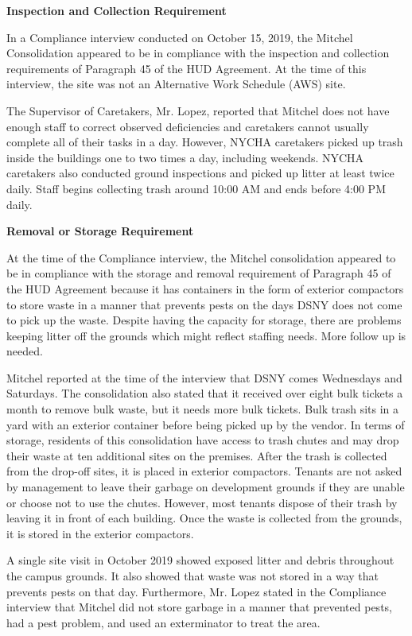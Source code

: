

\textbf{Inspection and Collection Requirement}

In a Compliance interview conducted on October 15, 2019, the Mitchel Consolidation appeared to be in compliance with the inspection and collection requirements of Paragraph 45 of the HUD Agreement. At the time of this interview, the site was not an Alternative Work Schedule (AWS) site. 

The Supervisor of Caretakers, Mr. Lopez, reported that Mitchel does not have enough staff to correct observed deficiencies and caretakers cannot usually complete all of their tasks in a day. However, NYCHA caretakers picked up trash inside the buildings one to two times a day, including weekends. NYCHA caretakers also conducted ground inspections and picked up litter at least twice daily. Staff begins collecting trash around 10:00 AM and ends before 4:00 PM daily. 

\textbf{Removal or Storage Requirement}

At the time of the Compliance interview, the Mitchel consolidation appeared to be in compliance with the storage and removal requirement of Paragraph 45 of the HUD Agreement because it has containers in the form of exterior compactors to store waste in a manner that prevents pests on the days DSNY does not come to pick up the waste. Despite having the capacity for storage, there are problems keeping litter off the grounds which might reflect staffing needs. More follow up is needed. 

Mitchel reported at the time of the interview that DSNY comes Wednesdays and Saturdays. The consolidation also stated that it received over eight bulk tickets a month to remove bulk waste, but it needs more bulk tickets. Bulk trash sits in a yard with an exterior container before being picked up by the vendor. In terms of storage, residents of this consolidation have access to trash chutes and may drop their waste at ten additional sites on the premises. After the trash is collected from the drop-off sites, it is placed in exterior compactors. Tenants are not asked by management to leave their garbage on development grounds if they are unable or choose not to use the chutes. However, most tenants dispose of their trash by leaving it in front of each building. Once the waste is collected from the grounds, it is stored in the exterior compactors.  

A single site visit in October 2019 showed exposed litter and debris throughout the campus grounds. It also showed that waste was not stored in a way that prevents pests on that day. Furthermore, Mr. Lopez stated in the Compliance interview that Mitchel did not store garbage in a manner that prevented pests, had a pest problem, and used an exterminator to treat the area.

